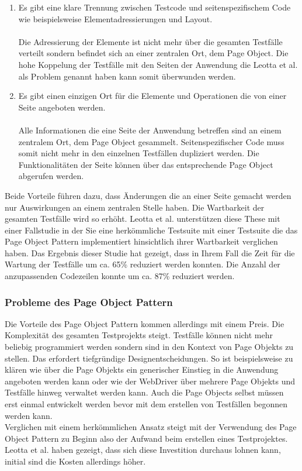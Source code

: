 \begin{enumerate}
\item Es gibt eine klare Trennung zwischen Testcode und seitenspezifischem Code wie beispielsweise Elementadressierungen und Layout. \\ \\
Die Adressierung der Elemente ist nicht mehr über die gesamten Testfälle verteilt sondern befindet sich an einer zentralen Ort, dem Page Object.
Die hohe Koppelung der Testfälle mit den Seiten der Anwendung die Leotta et al. \cite{leotta_repairing_2013} als Problem genannt haben kann somit überwunden werden.

\item Es gibt einen einzigen Ort für die Elemente und Operationen die von einer Seite angeboten werden. \\ \\
Alle Informationen die eine Seite der Anwendung betreffen sind an einem zentralem Ort, dem Page Object gesammelt. Seitenspezifischer Code muss somit nicht mehr in den einzelnen Testfällen dupliziert werden. Die Funktionalitäten der Seite können über das entsprechende Page Object abgerufen werden.

\end{enumerate}

Beide Vorteile führen dazu, dass Änderungen die an einer Seite gemacht werden nur Auswirkungen an einem zentralen Stelle haben. Die Wartbarkeit der gesamten Testfälle wird so erhöht.
Leotta et al. unterstützen diese These mit einer Fallstudie \cite{leotta_repairing_2013} in der Sie eine herkömmliche Testsuite mit einer Testsuite die das Page Object Pattern implementiert hinsichtlich ihrer Wartbarkeit verglichen haben.
Das Ergebnis dieser Studie hat gezeigt, dass in Ihrem Fall die Zeit für die Wartung der Testfälle um ca. 65\% reduziert werden konnten. Die Anzahl der anzupassenden Codezeilen konnte um ca. 87\% reduziert werden.

\subsubsection{Probleme des Page Object Pattern}
\label{sec:probleme_des_page_object_pattern}

Die Vorteile des Page Object Pattern kommen allerdings mit einem Preis. Die Komplexität des gesamten Testprojekts steigt. Testfälle können nicht mehr beliebig programmiert werden sondern sind in den Kontext von Page Objekts zu stellen. Das erfordert tiefgründige Designentscheidungen. So ist beispielsweise zu klären wie über die Page Objekts ein generischer Einstieg in die Anwendung angeboten werden kann oder wie der WebDriver über mehrere Page Objekts und Testfälle hinweg verwaltet werden kann. Auch die Page Objects selbst müssen erst einmal entwickelt werden bevor mit dem erstellen von Testfällen begonnen werden kann.\\
Verglichen mit einem herkömmlichen Ansatz steigt mit der Verwendung des Page Object Pattern zu Beginn also der Aufwand beim erstellen eines Testprojektes. Leotta et al. \cite{leotta_repairing_2013} haben gezeigt, dass sich diese Investition durchaus lohnen kann, initial sind die Kosten allerdings höher.
